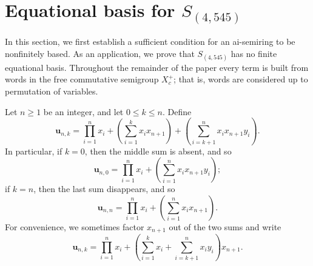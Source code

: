 \documentclass[reqno]{amsart}
\theoremstyle{plain}
\theoremstyle{definition}
\newcommand{\bu}{\mathbf{u}}
\begin{document}
\section{Equational basis for $S_{(4,545)}$}\label{sec4}
In this section, we first establish a sufficient condition for an ai-semiring to be nonfinitely based.
As an application, we prove that $S_{(4,545)}$ has no finite equational basis.
Throughout the remainder of the paper
every term is built from words in the free commutative semigroup $X^+_c$;
that is, words are considered up to permutation of variables.

Let $n\geq 1$ be an integer, and let $0\leq k\leq n$. Define
\[
\bu_{n, k}=\prod_{i=1}^n x_i+\left(\sum_{i=1}^kx_ix_{n+1}\right)+\left(\sum_{i=k+1}^nx_ix_{n+1}y_i\right).
\]
In particular, if $k=0$, then the middle sum is absent, and so
\[
\bu_{n, 0}=\prod_{i=1}^n x_i+\left(\sum_{i=1}^nx_ix_{n+1}y_i\right);
\]
if $k=n$, then the last sum disappears, and so
\[
\bu_{n, n}=\prod_{i=1}^n x_i+\left(\sum_{i=1}^nx_ix_{n+1}\right).
\]
For convenience, we sometimes factor $x_{n+1}$ out of the two sums and write
\[
\bu_{n, k}=\prod_{i=1}^n x_i+\left(\sum_{i=1}^kx_i+\sum_{i=k+1}^nx_iy_i\right)x_{n+1}.
\]
\end{document}
